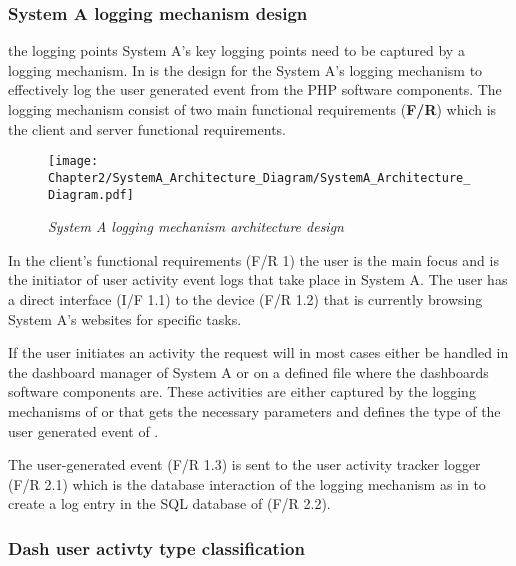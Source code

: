 \subsubsection{System A logging mechanism design}
 the logging points System A's key logging points need to be captured by a logging mechanism. In  is the design for the System A's logging mechanism to effectively log the user generated event from the PHP software components. The logging mechanism consist of two main functional requirements (\textbf{F/R}) which is the client and server functional requirements.

\begin{figure}[!htb] %
	\centering %
	\texttt{[image: Chapter2/SystemA\_Architecture\_Diagram/SystemA\_Architecture\_Diagram.pdf]}
	\caption[System A logging mechanism architecture design]
	{\textit{System A logging mechanism architecture design}}\label{fig:ch2_SystemA_Arch_Design}
\end{figure}

In the client's functional requirements (F/R 1) the user is the main focus and is the initiator of user activity event logs that take place in System A. The user has a direct interface (I/F 1.1) to the device (F/R 1.2) that is currently browsing System A's websites for specific tasks.\par If the user initiates an activity the request will in most cases either be handled in the dashboard manager of System A or on a defined file where the dashboards software components are. These activities are either captured by the logging mechanisms of  or  that gets the necessary parameters and defines the type of the user generated event of . \par The user-generated event (F/R 1.3) is sent to the user activity tracker logger (F/R 2.1) which is the database interaction of the logging mechanism as in  to create a log entry in the SQL database of (F/R 2.2).

\subsubsection{Dash user activty type classification}


